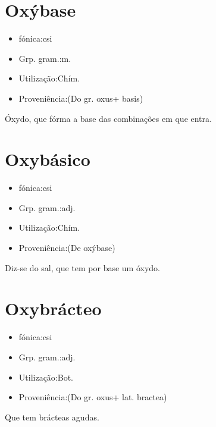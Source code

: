 \section{Oxýbase}
\begin{itemize}
\item {fónica:csi}
\end{itemize}
\begin{itemize}
\item {Grp. gram.:m.}
\end{itemize}
\begin{itemize}
\item {Utilização:Chím.}
\end{itemize}
\begin{itemize}
\item {Proveniência:(Do gr. \textunderscore oxus\textunderscore  + \textunderscore basis\textunderscore )}
\end{itemize}
Óxydo, que fórma a base das combinações em que entra.
\section{Oxybásico}
\begin{itemize}
\item {fónica:csi}
\end{itemize}
\begin{itemize}
\item {Grp. gram.:adj.}
\end{itemize}
\begin{itemize}
\item {Utilização:Chím.}
\end{itemize}
\begin{itemize}
\item {Proveniência:(De \textunderscore oxýbase\textunderscore )}
\end{itemize}
Diz-se do sal, que tem por base um óxydo.
\section{Oxybrácteo}
\begin{itemize}
\item {fónica:csi}
\end{itemize}
\begin{itemize}
\item {Grp. gram.:adj.}
\end{itemize}
\begin{itemize}
\item {Utilização:Bot.}
\end{itemize}
\begin{itemize}
\item {Proveniência:(Do gr. \textunderscore oxus\textunderscore  + lat. \textunderscore bractea\textunderscore )}
\end{itemize}
Que tem brácteas agudas.
